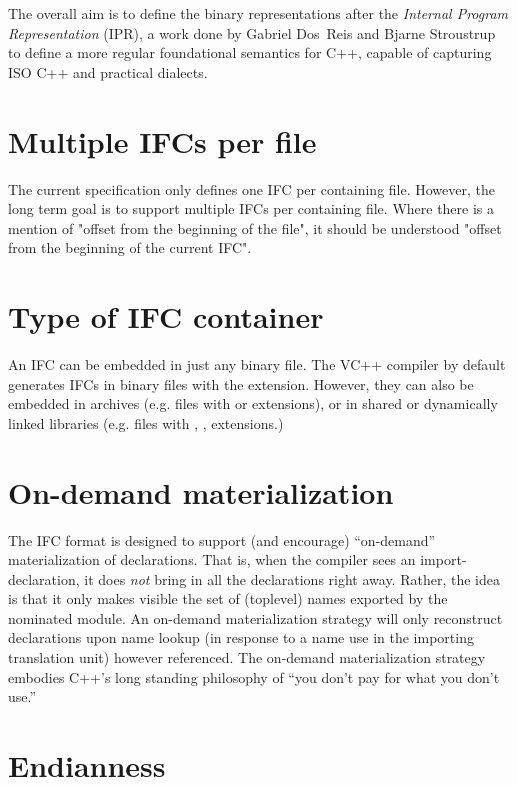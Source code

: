 \noindent
The overall aim is to define the binary representations after the 
\emph{Internal Program Representation} (IPR), a work done by Gabriel Dos~Reis
and Bjarne Stroustrup \cite{gdr-bs:ipr-macis-special-issue,ipr:web} to define a more regular 
foundational semantics for
C++, capable of capturing ISO C++ and practical dialects.

\section{Multiple IFCs per file}
\label{sec:ifc-multiple-ifcs-per-file}

The current specification only defines one IFC per containing file.  However, the long term goal is to support multiple IFCs per containing file.
Where there is a mention of "offset from the beginning of the file", it should be understood "offset from the beginning of the current IFC".

\section{Type of IFC container}
\label{sec:ifc-type-of-ifc-container}

An IFC can be embedded in just any binary file.  The VC++ compiler by default generates IFCs in binary files with the 
 extension.  However, they can also be embedded in archives (e.g. files with  or  extensions), or
in shared or dynamically linked libraries (e.g. files with , ,  extensions.)

\section{On-demand materialization}

The IFC format is designed to support (and encourage) ``on-demand''
materialization of declarations.  That is, when the compiler sees an
import-declaration, it does \emph{not} bring in all the declarations
right away.  Rather, the idea is that it only makes visible
the set of (toplevel) names exported by the nominated module.  An
on-demand materialization strategy will only reconstruct declarations
upon name lookup (in response to a name use in the importing
translation unit) however referenced.  The on-demand materialization
strategy embodies C++'s long standing philosophy of ``you don't pay
for what you don't use.''

\section{Endianness}
\label{sec:ifc-endianness}


